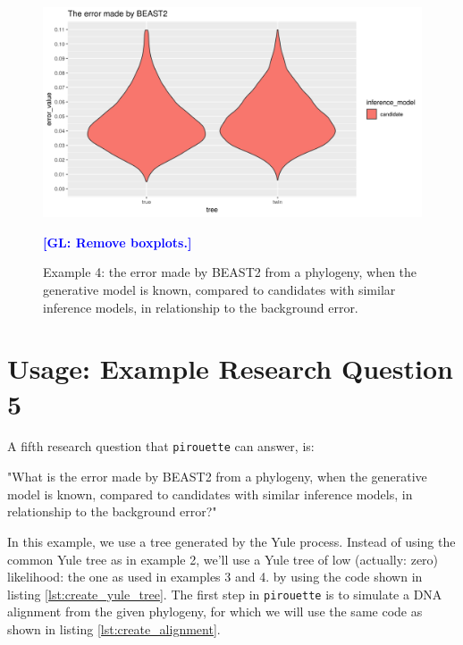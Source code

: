 \documentclass{article}
\newcommand{\giovanni}[1]{\textcolor{blue}{\textbf{[GL: #1]}}}
\begin{document}
\begin{figure}[ht]
  \includegraphics[width=\textwidth]{example_4_errors.png}
  \caption{
    Example 4: the error made by BEAST2 from a phylogeny, when the generative model is known, compared to candidates with similar inference models, in relationship to the background error.
  }
  \label{fig:example_4}
  \giovanni{Remove boxplots.}
\end{figure}


\section{Usage: Example Research Question 5}

A fifth research question that \verb;pirouette; can answer, is:

"What is the error made by BEAST2 from a phylogeny, 
when the generative model is known, 
compared to candidates with similar inference models, 
in relationship to the background error?"

In this example, we use a tree generated by the Yule process.
Instead of using the common Yule tree as in example 2, we'll use
a Yule tree of low (actually: zero) likelihood: 
the one as used in examples 3 and 4.
by using the code shown in listing \ref{lst:create_yule_tree}.
The first step in \verb;pirouette; is to simulate a DNA alignment 
from the given phylogeny, for which we will use the same code 
as shown in listing \ref{lst:create_alignment}.
\end{document}
